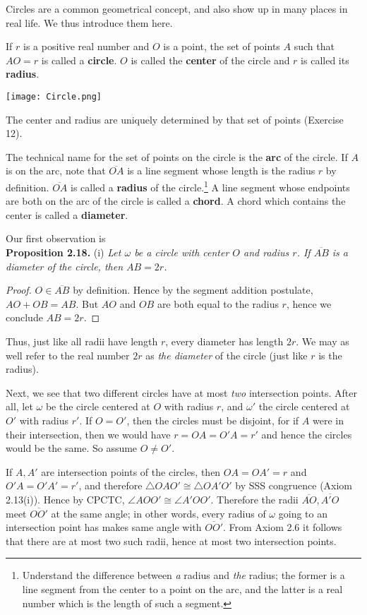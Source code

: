 \documentclass[leqno]{book}
\begin{document}
\noindent Circles are a common geometrical concept, and also show up in many places in real life.  We thus introduce them here.

If $r$ is a positive real number and $O$ is a point, the set of points $A$ such that $AO=r$ is called a \textbf{circle}.  $O$ is called the \textbf{center} of the circle and $r$ is called its \textbf{radius}.
\begin{center}\texttt{[image: Circle.png]}\end{center}
The center and radius are uniquely determined by that set of points (Exercise 12).

The technical name for the set of points on the circle is the \textbf{arc} of the circle.  If $A$ is on the arc, note that $\overline{OA}$ is a line segment whose length is the radius $r$ by definition.  $\overline{OA}$ is called a \textbf{radius} of the circle.\footnote{Understand the difference between \emph{a} radius and \emph{the} radius; the former is a line segment from the center to a point on the arc, and the latter is a real number which is the length of such a segment.}  A line segment whose endpoints are both on the arc of the circle is called a \textbf{chord}.  A chord which contains the center is called a \textbf{diameter}.

Our first observation is\\

\noindent\textbf{Proposition 2.18.} (i) \emph{Let $\omega$ be a circle with center $O$ and radius $r$.  If $\overline{AB}$ is a diameter of the circle, then $AB=2r$.}
\begin{proof}
$O\in\overline{AB}$ by definition.  Hence by the segment addition postulate, $AO+OB=AB$.  But $AO$ and $OB$ are both equal to the radius $r$, hence we conclude $AB=2r$.
\end{proof}
Thus, just like all radii have length $r$, every diameter has length $2r$.  We may as well refer to the real number $2r$ as \emph{the diameter} of the circle (just like $r$ is the radius).

Next, we see that two different circles have at most \emph{two} intersection points.  After all, let $\omega$ be the circle centered at $O$ with radius $r$, and $\omega'$ the circle centered at $O'$ with radius $r'$.  If $O=O'$, then the circles must be disjoint, for if $A$ were in their intersection, then we would have $r=OA=O'A=r'$ and hence the circles would be the same.  So assume $O\ne O'$.

If $A,A'$ are intersection points of the circles, then $OA=OA'=r$ and $O'A=O'A'=r'$, and therefore $\triangle OAO'\cong\triangle OA'O'$ by SSS congruence (Axiom 2.13(i)).  Hence by CPCTC, $\angle AOO'\cong\angle A'OO'$.  Therefore the radii $\overline{AO},\overline{A'O}$ meet $\overline{OO'}$ at the same angle; in other words, every radius of $\omega$ going to an intersection point has makes same angle with $\overline{OO'}$.  From Axiom 2.6 it follows that there are at most two such radii, hence at most two intersection points.
\end{document}
